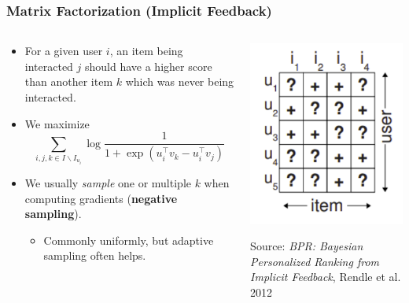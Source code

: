 \documentclass[11pt]{beamer}
\begin{document}
	\begin{frame}
		\frametitle{Matrix Factorization (Implicit Feedback)}
		\begin{columns}
			\begin{column}{0.6\textwidth}
				\begin{itemize}
					\item<1-> For a given user $i$, an item being interacted $j$ should have a higher score than another item $k$ which was never being interacted.
					\item<2-> We maximize
					$$
					\sum_{i,j,k\in I \backslash I_{u_i}}
					\log \dfrac{1}{1 + \exp\left(u_i^\top v_k - u_i^\top v_j\right)}
					$$
					\item<3-> We usually \emph{sample} one or multiple $k$ when computing gradients (\textbf{negative sampling}).
					\begin{itemize}
						\item Commonly uniformly, but adaptive sampling often helps.
					\end{itemize}
				\end{itemize}
			\end{column}
			\begin{column}{0.4\textwidth}
				\begin{center}
					\centering
					\includegraphics[width=\textwidth]{images/implicit.png}
					
					{\tiny Source: \textit{BPR: Bayesian Personalized Ranking from Implicit Feedback}, Rendle et al. 2012}
				\end{center}
			\end{column}
		\end{columns}
	\end{frame}
\end{document}

